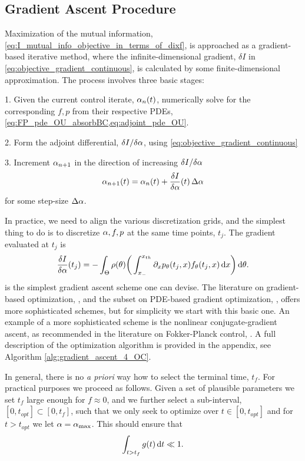 \documentclass{article}
\def \tf {{t_f}}
\def \topt {{ t_{opt}}}
\begin{document}
\subsection{Gradient Ascent Procedure}
\label{sec:gradient_ascent}
Maximization of the mutual information,
\cref{eq:I_mutual_info_objective_in_terms_of_dixf}, is approached as a
gradient-based iterative method, where the 
infinite-dimensional gradient, $\delta I$ in
\cref{eq:objective_gradient_continuous}, is calculated by some finite-dimensional
approximation. 
The process involves three basic stages:

1. Given the current control iterate, ${\alpha}_n(t)$, numerically solve for the
  corresponding $f,p$ from their respective PDEs,
  \cref{eq:FP_pde_OU_absorbBC,eq:adjoint_pde_OU}.

2. Form the adjoint differential,
  $\delta I / \delta {\alpha}$, using
  \cref{eq:objective_gradient_continuous}

3. Increment ${\alpha}_{n+1}$ in the direction of increasing $\delta I / \delta
  {\alpha}$
  \begin{equation}
{\alpha}_{n+1}(t) = {\alpha}_n(t) + \frac {\delta I }{\delta {\alpha}} (t) \, \Delta {\alpha}
\label{eq:simple_gradient_ascent_increment}
\end{equation}
for some step-size $\Delta {\alpha}$.

In practice, we need to align the various discretization grids, and the simplest
thing to do is to discretize ${\alpha},f,p$ at the same time points, $t_j$.
The gradient evaluated at $t_j$ is $$ 
\frac {\delta I }{\delta {\alpha}}(t_j) =   
	-\int_\Theta  \rho({\theta})  \bigg(  
	\int_{ x_{-} }^{{ x_{th} }} {\partial}_x p_{\theta}(t_j,x) f_{\theta}(t_j,x) \, \mathrm{d} x    
	    \bigg) \, \mathrm{d} {\theta}.
$$
 is the simplest gradient ascent
scheme one can devise. The literature on gradient-based optimization,
\cite{Nocedal1999}, and the subset on PDE-based gradient optimization,
\cite{Borzi2012}, offers more sophisticated schemes, but for simplicity
we start with this basic one. An example of a more sophisticated scheme
is the nonlinear conjugate-gradient ascent, as recommended in the literature on
Fokker-Planck control, \cite{Annunziato2013}.
 A full description of the optimization algorithm is provided in the appendix, see
Algorithm \ref{alg:gradient_ascent_4_OC}.

In general, there is no {\sl a priori} way how to select the terminal
time, $\tf$. 
For practical purposes we proceed as follows. Given a set of plausible
parameters we set $\tf$ large enough for $f\approx 0$, and we further select a sub-interval,
$[0, \topt] \subset [0, \tf]$, such that we only seek to optimize over $t\in
[0, \topt]$ and for $t > \topt$ we let ${\alpha}= { {\alpha}_{\textrm{max}} }$. This should ensure
that $$\int_{t>\tf} g(t) \intd{t} 
\ll 1.$$
\end{document}
